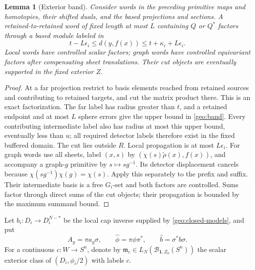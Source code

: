 \documentclass[11pt]{amsart}
\numberwithin{equation}{section}
\newtheorem{lemma}[lemma]{Lemma}
\theoremstyle{definition}
\theoremstyle{remark}
\begin{document}
\begin{lemma}[Exterior band]\label{geo:band-factorization}
Consider words in the preceding primitive maps and homotopies, their
shifted duals, and the based projections and sections. A
retained-to-retained word of fixed length at most $L$ containing
$Q$ or $Q^*$ factors through a based module labeled in
\begin{equation}\label{geo:band}
 t-L\epsilon_i\le d(y,f(x))\le t+\kappa_i+L\epsilon_i.
\end{equation}
Local words have controlled scalar factors; graph words have controlled
equivariant factors after compensating sheet translations. Their cut
objects are eventually supported in the fixed exterior $Z$.
\end{lemma}
\begin{proof}
At a far projection restrict to basis elements reached from retained
sources and contributing to retained targets, and cut the matrix product
there. This is an exact factorization. The far label has radius greater
than $t$, and a retained endpoint and at most $L$ sphere errors give the
upper bound in \eqref{geo:band}. Every contributing intermediate label
also has radius at most this upper bound, eventually less than $u$;
all required detector labels therefore exist in the fixed buffered domain.
The cut lies outside $R$. Local propagation is at most $L\epsilon_i$.
For graph words use all sheets, label $(x,s)$ by
$(\chi(s)\widetilde\rho(x),f(x))$, and accompany a graph-$g$ primitive by
$s\mapsto sg^{-1}$. Its detector displacement cancels because
$\chi(sg^{-1})\chi(g)=\chi(s)$. Apply this separately to the prefix
and suffix. Their intermediate basis is a free $G_i$-set and both factors
are controlled. Sums factor through direct sums of the cut objects;
their propagation is bounded by the maximum summand bound.
\end{proof}

Let $b_i:D_i\to D_i^{N-*}$ be the local cap inverse supplied by
\cref{geo:closed-models}, and put
\begin{equation}\label{geo:compressed-maps}
 A_g=\pi a_g\sigma,\qquad
 \widehat\phi=\pi\phi\pi^*,\qquad
 \widehat b=\sigma^*b\sigma.
\end{equation}
For a continuous $c:W\to S^n$, denote by
$\mathfrak m_c\in L_N(\mathcal B_{\mathbf1,Z_0}(S^n))$ the scalar
exterior class of $(D_i,\phi_i/2)$ with labels $c$.
\end{document}
